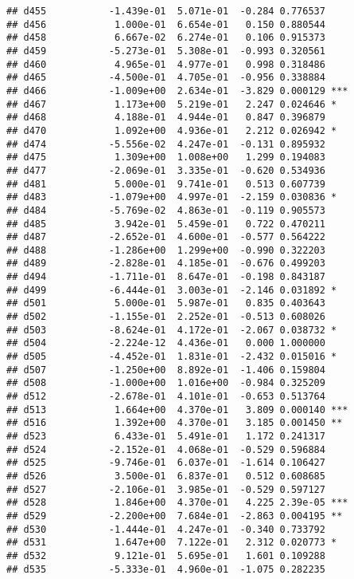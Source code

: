 \documentclass[
]{article}
\begin{document}
\begin{verbatim}
## d455           -1.439e-01  5.071e-01  -0.284 0.776537    
## d456            1.000e-01  6.654e-01   0.150 0.880544    
## d458            6.667e-02  6.274e-01   0.106 0.915373    
## d459           -5.273e-01  5.308e-01  -0.993 0.320561    
## d460            4.965e-01  4.977e-01   0.998 0.318486    
## d465           -4.500e-01  4.705e-01  -0.956 0.338884    
## d466           -1.009e+00  2.634e-01  -3.829 0.000129 ***
## d467            1.173e+00  5.219e-01   2.247 0.024646 *  
## d468            4.188e-01  4.944e-01   0.847 0.396879    
## d470            1.092e+00  4.936e-01   2.212 0.026942 *  
## d474           -5.556e-02  4.247e-01  -0.131 0.895932    
## d475            1.309e+00  1.008e+00   1.299 0.194083    
## d477           -2.069e-01  3.335e-01  -0.620 0.534936    
## d481            5.000e-01  9.741e-01   0.513 0.607739    
## d483           -1.079e+00  4.997e-01  -2.159 0.030836 *  
## d484           -5.769e-02  4.863e-01  -0.119 0.905573    
## d485            3.942e-01  5.459e-01   0.722 0.470211    
## d487           -2.652e-01  4.600e-01  -0.577 0.564222    
## d488           -1.286e+00  1.299e+00  -0.990 0.322203    
## d489           -2.828e-01  4.185e-01  -0.676 0.499203    
## d494           -1.711e-01  8.647e-01  -0.198 0.843187    
## d499           -6.444e-01  3.003e-01  -2.146 0.031892 *  
## d501            5.000e-01  5.987e-01   0.835 0.403643    
## d502           -1.155e-01  2.252e-01  -0.513 0.608026    
## d503           -8.624e-01  4.172e-01  -2.067 0.038732 *  
## d504           -2.224e-12  4.436e-01   0.000 1.000000    
## d505           -4.452e-01  1.831e-01  -2.432 0.015016 *  
## d507           -1.250e+00  8.892e-01  -1.406 0.159804    
## d508           -1.000e+00  1.016e+00  -0.984 0.325209    
## d512           -2.678e-01  4.101e-01  -0.653 0.513764    
## d513            1.664e+00  4.370e-01   3.809 0.000140 ***
## d516            1.392e+00  4.370e-01   3.185 0.001450 ** 
## d523            6.433e-01  5.491e-01   1.172 0.241317    
## d524           -2.152e-01  4.068e-01  -0.529 0.596884    
## d525           -9.746e-01  6.037e-01  -1.614 0.106427    
## d526            3.500e-01  6.837e-01   0.512 0.608685    
## d527           -2.106e-01  3.985e-01  -0.529 0.597127    
## d528            1.846e+00  4.370e-01   4.225 2.39e-05 ***
## d529           -2.200e+00  7.684e-01  -2.863 0.004195 ** 
## d530           -1.444e-01  4.247e-01  -0.340 0.733792    
## d531            1.647e+00  7.122e-01   2.312 0.020773 *  
## d532            9.121e-01  5.695e-01   1.601 0.109288    
## d535           -5.333e-01  4.960e-01  -1.075 0.282235    

\end{verbatim}
\end{document}
